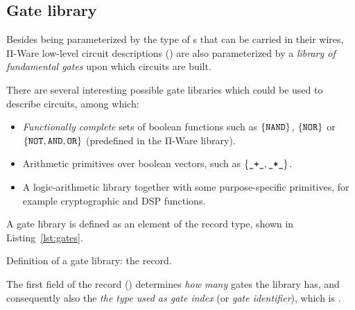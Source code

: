         \subsection{Gate library}
        \label{subsec:gate-library}
            Besides being parameterized by the type of s that can be carried in their wires,
            Π-Ware low-level circuit descriptions () are also parameterized by
            a \emph{library of fundamental gates} upon which circuits are built.

            There are several interesting possible gate libraries which could be used to describe circuits,
            among which:

            \begin{itemize}
                \item \emph{Functionally complete} sets of boolean functions such as
                    $\{ \text{\texttt{NAND}} \}$, $\{ \text{\texttt{NOR}} \}$ or
                    $\{ \text{\texttt{NOT}}, \text{\texttt{AND}}, \text{\texttt{OR}} \}$
                    (predefined in the Π-Ware library).
                \item Arithmetic primitives over boolean vectors, such as $\{ \text{\texttt{\_+\_}}, \text{\texttt{\_*\_}} \}$.
                \item A logic-arithmetic library together with some purpose-specific primitives,
                    for example cryptographic and \ac{DSP} functions.
            \end{itemize}

            A gate library is defined as an element of the  record type, shown in Listing~\ref{lst:gates}.

            \begin{listing}[h]
                \newline
                \caption{Definition of a gate library: the  record.\label{lst:gates}}
            \end{listing}

            The first field of the  record () determines \emph{how many}
            gates the library has, and consequently also the \emph{the type used as gate index}
            (or \emph{gate identifier}), which is  \AY{=}  .

